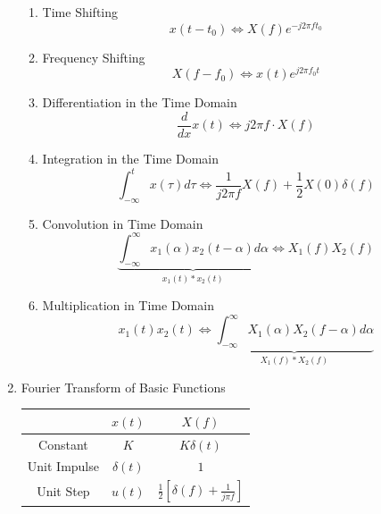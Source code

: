 \begin{enumerate}
\begin{enumerate}
        \item Time Shifting
        \begin{equation}
            x(t-t_0) \Longleftrightarrow X(f)e^{-j2\pi ft_0}
        \end{equation}
        \item Frequency Shifting
        \begin{equation}
            X(f-f_0) \Longleftrightarrow x(t)e^{j2\pi f_0t}
        \end{equation}
        \item Differentiation in the Time Domain
        \begin{equation}
            \frac{d}{dx}x(t) \Longleftrightarrow j2\pi f \cdot X(f)
        \end{equation}
        \item Integration in the Time Domain
        \begin{equation}
            \int^t_{-\infty}x(\tau)d\tau \Longleftrightarrow \frac{1}{j2\pi f}X(f)+\frac{1}{2}X(0)\delta(f) 
        \end{equation}
        \item Convolution in Time Domain
        \begin{equation}
            \underbrace{\int^{\infty}_{-\infty}x_1(\alpha)x_2(t-\alpha)d\alpha}_\text{$x_1(t)*x_2(t)$}\Longleftrightarrow X_1(f)X_2(f)
        \end{equation}
        \item Multiplication in Time Domain
        \begin{equation}
            x_1(t)x_2(t)\Longleftrightarrow \underbrace{\int^{\infty}_{-\infty}X_1(\alpha)X_2(f-\alpha)d\alpha}_\text{$X_1(f)*X_2(f)$}
        \end{equation}
    \end{enumerate}
    \newpage
    \item Fourier Transform of Basic Functions
    \begin{table}[h]
        \setlength{\arrayrulewidth}{0.3mm}
        \renewcommand{\arraystretch}{1.93}
        \centering
        \begin{tabular}{|c|c|c|}
        \hline
        &   $x(t)$     & $X(f)$ \\
        \hline
        Constant & $K$ & $K\delta(t)$ \\
        \hline
        Unit Impulse & $\delta(t)$ & $1$ \\
        \hline
        Unit Step & $u(t)$ & $\displaystyle \frac{1}{2}[\delta(f) + \frac{1}{j\pi f}]$ \\

\end{tabular}
\end{table}
\end{enumerate}
